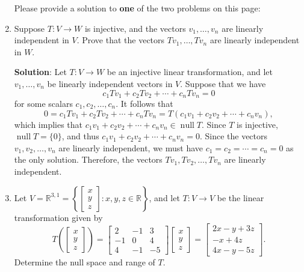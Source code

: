 \documentclass[12pt]{article}
\newcommand{\points}[1]{\marginpar{\hspace{24pt}[#1]}}
\newcommand{\R}{\mathbb{R}}
\DeclareMathOperator{\nul}{null}
\begin{document}
\begin{enumerate}
\newpage
Please provide a solution to {\bf one} of the two problems on this page:
\item Suppose $T:V\to W$ is injective, and the vectors $v_1,\ldots, v_n$ are linearly independent in $V$. Prove that the vectors $Tv_1,\ldots, Tv_n$ are linearly independent in $W$. \points{10}

\bigskip

{\bf Solution}: Let $T:V\to W$ be an injective linear transformation, and let $v_1,\ldots, v_n$ be linearly independent vectors in $V$. Suppose that we have
\[
 c_1Tv_1+c_2Tv_2+\cdots +c_nTv_n = 0
\]
for some scalars $c_1,c_2,\ldots, c_n$. It follows that
\[
 0 = c_1Tv_1+c_2Tv_2+\cdots +c_nTv_n = T(c_1v_1+c_2v_2+\cdots +c_nv_n),
\]
which implies that $c_1v_1+c_2v_2+\cdots +c_nv_n\in \nul T$. Since $T$ is injective, $\nul T = \{0\}$, and thus $c_1v_1+c_2v_2+ \cdots +c_nv_n=0$. Since the vectors $v_1,v_2,\ldots, v_n$ are linearly independent, we must have $c_1=c_2=\cdots =c_n=0$ as the only solution. Therefore, the vectors $Tv_1,Tv_2,\ldots, Tv_n$ are linearly independent.

\newpage

\item Let $V=\R^{3,1} = \left\{\begin{bmatrix}x\\y\\z\end{bmatrix} : x,y,z\in\R\right\}$, and let $T:V\to V$ be the linear transformation given by\points{10}
\[
T\left(\begin{bmatrix}x\\y\\z\end{bmatrix}\right) = \begin{bmatrix}2&-1&3\\-1&0&4\\4&-1&-5\end{bmatrix}\begin{bmatrix}
x\\y\\z
\end{bmatrix}=\begin{bmatrix}
2x-y+3z\\-x+4z\\4x-y-5z
\end{bmatrix}.
\]
Determine the null space and range of $T$.

\bigskip


\end{enumerate}
\end{document}
